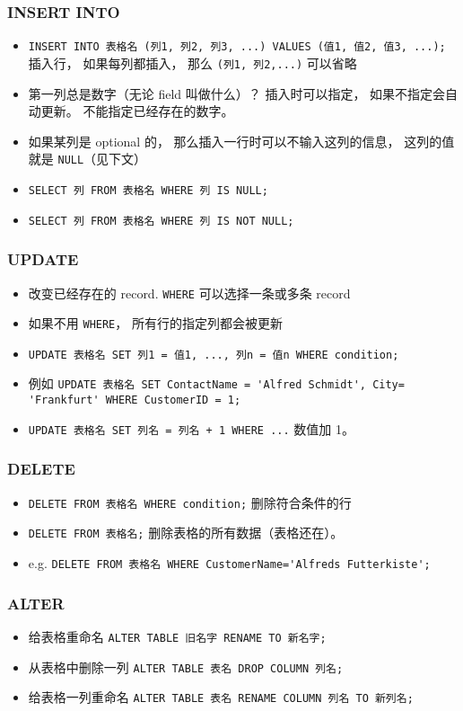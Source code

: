 \subsubsection{INSERT INTO}
\begin{itemize}
\item \verb`INSERT INTO 表格名 (列1, 列2, 列3, ...) VALUES (值1, 值2, 值3, ...);` 插入行， 如果每列都插入， 那么 \verb`(列1, 列2,...)` 可以省略
\item 第一列总是数字（无论 field 叫做什么）？ 插入时可以指定，  如果不指定会自动更新。 不能指定已经存在的数字。
\item 如果某列是 optional 的， 那么插入一行时可以不输入这列的信息， 这列的值就是 \verb`NULL`（见下文）
\item \verb`SELECT 列 FROM 表格名 WHERE 列 IS NULL;`
\item \verb`SELECT 列 FROM 表格名 WHERE 列 IS NOT NULL;`
\end{itemize}

\subsubsection{UPDATE}
\begin{itemize}
\item 改变已经存在的 record. \verb`WHERE` 可以选择一条或多条 record
\item 如果不用 \verb`WHERE`， 所有行的指定列都会被更新
\item \verb`UPDATE 表格名 SET 列1 = 值1, ..., 列n = 值n WHERE condition;`
\item 例如 \verb`UPDATE 表格名 SET ContactName = 'Alfred Schmidt', City= 'Frankfurt' WHERE CustomerID = 1;`
\item \verb`UPDATE 表格名 SET 列名 = 列名 + 1 WHERE ...` 数值加 1。
\end{itemize}

\subsubsection{DELETE}
\begin{itemize}
\item \verb`DELETE FROM 表格名 WHERE condition;` 删除符合条件的行
\item \verb`DELETE FROM 表格名;` 删除表格的所有数据（表格还在）。
\item e.g. \verb`DELETE FROM 表格名 WHERE CustomerName='Alfreds Futterkiste';`
\end{itemize}

\subsubsection{ALTER}
\begin{itemize}
\item 给表格重命名 \verb`ALTER TABLE 旧名字 RENAME TO 新名字;`
\item 从表格中删除一列 \verb`ALTER TABLE 表名 DROP COLUMN 列名;`
\item 给表格一列重命名 \verb`ALTER TABLE 表名 RENAME COLUMN 列名 TO 新列名;`
\end{itemize}

